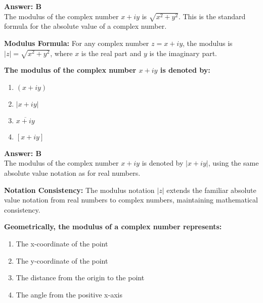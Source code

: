 \documentclass[12pt,a4paper]{article}
\begin{document}
\begin{answerstyle}
\textbf{Answer: B} \\
The modulus of the complex number \( x + iy \) is \( \sqrt{x^2 + y^2} \). This is the standard formula for the absolute value of a complex number.
\end{answerstyle}

\begin{conceptbox}
\textbf{Modulus Formula:} For any complex number \( z = x + iy \), the modulus is \( |z| = \sqrt{x^2 + y^2} \), where \( x \) is the real part and \( y \) is the imaginary part.
\end{conceptbox}

\newpage
\begin{questiontitle}[MCQ 89]
\textbf{The modulus of the complex number \( x + iy \) is denoted by:}
\end{questiontitle}

\begin{partbox}[Options]
\begin{enumerate}[label=\Alph*.]
    \item \( (x + iy) \)
    \item \( |x + iy| \)
    \item \( \overline{x + iy} \)
    \item \( [x + iy] \)
\end{enumerate}
\end{partbox}

\begin{answerstyle}
\textbf{Answer: B} \\
The modulus of the complex number \( x + iy \) is denoted by \( |x + iy| \), using the same absolute value notation as for real numbers.
\end{answerstyle}

\begin{conceptbox}
\textbf{Notation Consistency:} The modulus notation \( |z| \) extends the familiar absolute value notation from real numbers to complex numbers, maintaining mathematical consistency.
\end{conceptbox}

\newpage
\begin{questiontitle}[MCQ 90]
\textbf{Geometrically, the modulus of a complex number represents:}
\end{questiontitle}

\begin{partbox}[Options]
\begin{enumerate}[label=\Alph*.]
    \item The x-coordinate of the point
    \item The y-coordinate of the point
    \item The distance from the origin to the point
    \item The angle from the positive x-axis
\end{enumerate}
\end{partbox}
\end{document}

